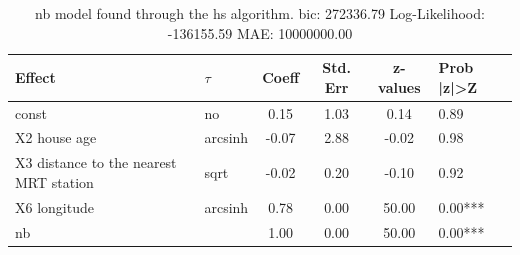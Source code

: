 \begin{table}
	\caption{nb model found through the hs algorithm. bic: 272336.79 Log-Likelihood: -136155.59 MAE: 10000000.00}
	\begin{center}
		\begin{tabular}{|l|l|c|c|c|l|}
			\hline
			Effect & $\tau$ & Coeff & Std. Err & z-values & Prob |z|>Z \\
			\hline
			const & no & 0.15 & 1.03 & 0.14 & 0.89 \\
			\hline
			X2 house age & arcsinh & -0.07 & 2.88 & -0.02 & 0.98 \\
			\hline
			X3 distance to the nearest MRT station & sqrt & -0.02 & 0.20 & -0.10 & 0.92 \\
			\hline
			X6 longitude & arcsinh & 0.78 & 0.00 & 50.00 & 0.00*** \\
			\hline
			nb &  & 1.00 & 0.00 & 50.00 & 0.00*** \\
			\hline
		\end{tabular}
	\end{center}
\end{table}